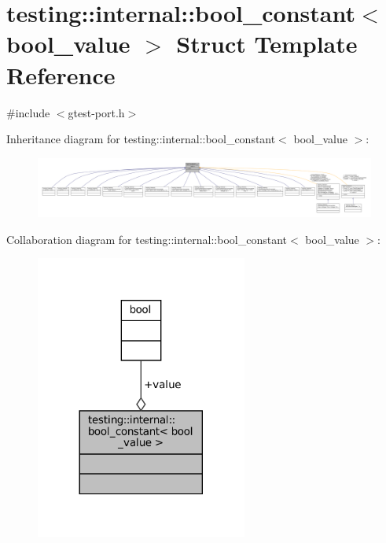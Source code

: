 \hypertarget{structtesting_1_1internal_1_1bool__constant}{}\section{testing\+:\+:internal\+:\+:bool\+\_\+constant$<$ bool\+\_\+value $>$ Struct Template Reference}
\label{structtesting_1_1internal_1_1bool__constant}


{\ttfamily \#include $<$gtest-\/port.\+h$>$}



Inheritance diagram for testing\+:\+:internal\+:\+:bool\+\_\+constant$<$ bool\+\_\+value $>$\+:
\nopagebreak
\begin{figure}[H]
\begin{center}
\leavevmode
\includegraphics[width=350pt]{structtesting_1_1internal_1_1bool__constant__inherit__graph}
\end{center}
\end{figure}


Collaboration diagram for testing\+:\+:internal\+:\+:bool\+\_\+constant$<$ bool\+\_\+value $>$\+:
\nopagebreak
\begin{figure}[H]
\begin{center}
\leavevmode
\includegraphics[width=197pt]{structtesting_1_1internal_1_1bool__constant__coll__graph}
\end{center}
\end{figure}
